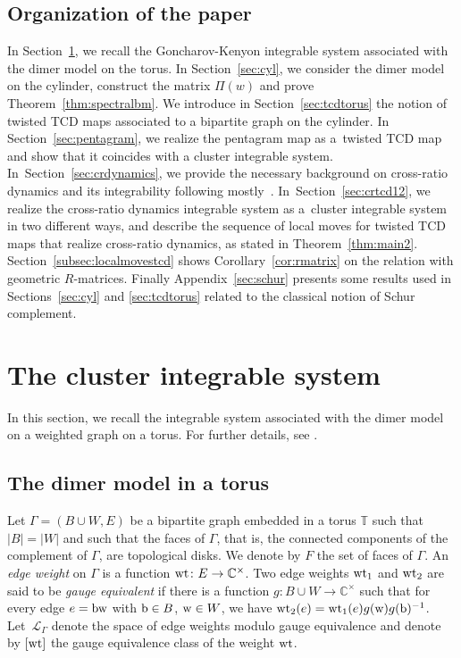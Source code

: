 \documentclass[pdftex]{sigma}
\numberwithin{equation}{section}
\newcommand{\C}{{\mathbb C}}
\newcommand{\T}{{\mathbb T}}
\newcommand{\ra}{\rightarrow}
\newcommand{\w}{{\rm w}}
\newcommand{\bw}{{\rm b}}
\begin{document}
	\subsection*{Organization of the paper}
	In Section~\ref{sec:gk}, we recall the Goncharov-Kenyon integrable system \cite{GK13} associated with the dimer model on the torus. In Section~\ref{sec:cyl}, we consider the dimer model on the cylinder, construct the matrix $\Pi(w)$ and prove Theorem~\ref{thm:spectralbm}. We introduce in Section~\ref{sec:tcdtorus} the notion of twisted TCD maps associated to a bipartite graph on the cylinder. In Section~\ref{sec:pentagram}, we realize the pentagram map as a~twisted TCD map and show that it coincides with a cluster integrable system. In~Section~\ref{sec:crdynamics}, we provide the necessary background on cross-ratio dynamics and its integrability following mostly~\cite{AFIT}. In~Section~\ref{sec:crtcd12}, we realize the cross-ratio dynamics integrable system as a~cluster integrable system in two different ways, and describe the sequence of local moves for twisted TCD maps that realize cross-ratio dynamics, as stated in Theorem~\ref{thm:main2}. Section~\ref{subsec:localmovestcd} shows Corollary~\ref{cor:rmatrix} on the relation with geometric $R$-matrices. Finally Appendix~\ref{sec:schur} presents some results used in Sections~\ref{sec:cyl} and \ref{sec:tcdtorus} related to the classical notion of Schur complement.
	
	
	\section{The cluster integrable system}
	\label{sec:gk}
	
	In this section, we recall the integrable system associated with the dimer model on a weighted graph on a torus. For further details, see \cite{GK13}.
	
	\subsection{The dimer model in a torus}
	
	Let $\Gamma=(B \cup W,E)$ be a bipartite graph embedded in a torus $\T$ such that $|B|=|W|$ and such that the faces of $\Gamma$, that is, the connected components of the complement of $\Gamma$, are topological disks. We denote by $F$ the set of faces of $\Gamma$. An \emph{edge weight} on $\Gamma$ is a function ${\rm wt}\colon E \ra \C^\times$. Two edge weights ${\rm wt}_1$ and ${\rm wt}_2$ are said to be \emph{gauge equivalent} if there is a function $g\colon B \cup W \ra \C^\times$ such that for every edge $e=\bw \w$ with ${\rm b} \in B$, ${\rm w}\in W$, we have ${\rm wt}_2(e)={\rm wt}_1(e) g({\rm w}) g({\rm b})^{-1}$. Let~$\mathcal L_\Gamma$ denote the space of edge weights modulo gauge equivalence {and denote by $[{\rm wt}]$ the gauge equivalence class of the weight ${\rm wt}$}.
	
\end{document}
